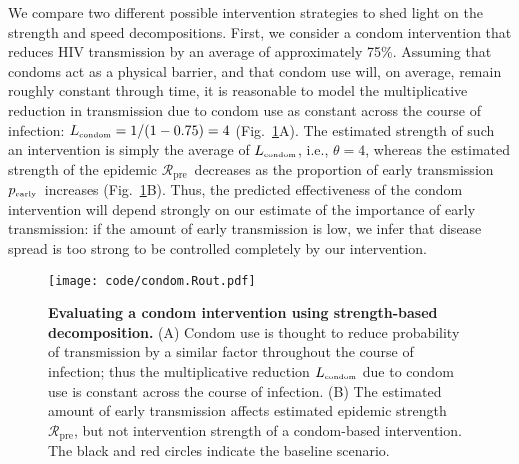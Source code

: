 \documentclass[12pt]{article}
\newcommand{\RR}{\ensuremath{{\mathcal R}}}
\newcommand{\Rx}[1]{\ensuremath{\RR_{\mathrm{#1}}}} %
\newcommand{\Rpre}{\Rx{pre}} %
\newcommand{\Rhat}{\ensuremath{{\hat\RR}}}
\newcommand{\tsub}[2]{#1_{{\textrm{\tiny #2}}}}
\newcommand{\pEarly}{\ensuremath{\tsub{p}{early}}}
\newcommand{\figref}[1]{Fig.~\ref{fig:#1}}
\newcommand{\figlab}[1]{\label{fig:#1}}
\providecommand{\DIFaddtex}[1]{{\protect\color{blue}\uwave{#1}}} %
\providecommand{\DIFaddbegin}{} %
\providecommand{\DIFaddend}{} %
\providecommand{\DIFdelbegin}{} %
\providecommand{\DIFdelend}{} %
\providecommand{\DIFaddFL}[1]{\DIFadd{#1}} %
\providecommand{\DIFaddbeginFL}{} %
\providecommand{\DIFaddendFL}{} %
\providecommand{\DIFdelbeginFL}{} %
\providecommand{\DIFdelendFL}{} %
\providecommand{\DIFadd}[1]{\texorpdfstring{\DIFaddtex{#1}}{#1}} %
\newcommand{\DIFscaledelfig}{0.5}
\newlength{\DIFdelgraphicswidth} %
\newlength{\DIFdelgraphicsheight} %
\newcommand{\DIFaddincludegraphics}[2][]{{\color{blue}\fbox{\DIFOincludegraphics[#1]{#2}}}} %
\newcommand{\DIFdelincludegraphics}[2][]{%
\sbox{\DIFdelgraphicsbox}{\DIFOincludegraphics[#1]{#2}}%
\settoboxwidth{\DIFdelgraphicswidth}{\DIFdelgraphicsbox} %
\settoboxtotalheight{\DIFdelgraphicsheight}{\DIFdelgraphicsbox} %
\scalebox{\DIFscaledelfig}{%
\parbox[b]{\DIFdelgraphicswidth}{\usebox{\DIFdelgraphicsbox}\\[-\baselineskip] \rule{\DIFdelgraphicswidth}{0em}}\llap{\resizebox{\DIFdelgraphicswidth}{\DIFdelgraphicsheight}{%
\setlength{\unitlength}{\DIFdelgraphicswidth}%
\begin{picture}(1,1)%
\thicklines\linethickness{2pt} %
{\color[rgb]{1,0,0}\put(0,0){\framebox(1,1){}}}%
{\color[rgb]{1,0,0}\put(0,0){\line( 1,1){1}}}%
{\color[rgb]{1,0,0}\put(0,1){\line(1,-1){1}}}%
\end{picture}%
}\hspace*{3pt}}} %
} %
\DeclareRobustCommand{\DIFaddbegin}{\DIFOaddbegin \let\includegraphics\DIFaddincludegraphics} %
\DeclareRobustCommand{\DIFaddend}{\DIFOaddend \let\includegraphics\DIFOincludegraphics} %
\DeclareRobustCommand{\DIFdelbegin}{\DIFOdelbegin \let\includegraphics\DIFdelincludegraphics} %
\DeclareRobustCommand{\DIFdelend}{\DIFOaddend \let\includegraphics\DIFOincludegraphics} %
\DeclareRobustCommand{\DIFaddbeginFL}{\DIFOaddbeginFL \let\includegraphics\DIFaddincludegraphics} %
\DeclareRobustCommand{\DIFaddendFL}{\DIFOaddendFL \let\includegraphics\DIFOincludegraphics} %
\DeclareRobustCommand{\DIFdelbeginFL}{\DIFOdelbeginFL \let\includegraphics\DIFdelincludegraphics} %
\DeclareRobustCommand{\DIFdelendFL}{\DIFOaddendFL \let\includegraphics\DIFOincludegraphics} %
\begin{document}
We compare two different possible intervention strategies to shed light on the strength and speed decompositions.
First, we consider a condom intervention that reduces HIV transmission by an average of approximately 75\%.
Assuming that condoms act as a physical barrier, and that condom use will, on average, remain roughly constant through time, it is reasonable to model the multiplicative reduction in transmission due to condom use as constant across the course of infection: $\tsub{L}{condom} = 1/(1-0.75) = 4$ (\figref{condom}A).
The estimated strength of such an intervention is simply the average of $\tsub{L}{condom}$, i.e., $\theta=4$, whereas the estimated strength of the epidemic \DIFdelbegin %
\DIFdelend \DIFaddbegin \Rpre\DIFaddend \ decreases as the proportion of early transmission \pEarly\ increases (\figref{condom}B).
Thus, the predicted effectiveness of the condom intervention will depend strongly on our estimate of the importance of early transmission: if the amount of early transmission is low, we infer that disease spread is too strong to be controlled completely by our intervention.

\begin{figure}[!t]
\texttt{[image: code/condom.Rout.pdf]}
\caption{
\textbf{Evaluating a condom intervention using strength-based decomposition.}
(A) Condom use is thought to reduce probability of transmission by a similar factor throughout the course of infection; thus the multiplicative reduction $\tsub{L}{condom}$ due to condom use is constant across the course of infection.
(B) The estimated amount of early transmission affects estimated epidemic strength \DIFdelbeginFL %
\DIFdelendFL \DIFaddbeginFL \Rpre\DIFaddendFL , but not intervention strength \DIFdelbeginFL %
\DIFdelendFL \DIFaddbeginFL \DIFaddFL{$\theta$ }\DIFaddendFL of a condom-based intervention.
The black and red circles indicate the baseline scenario.
}
\figlab{condom}
\end{figure}
\end{document}
